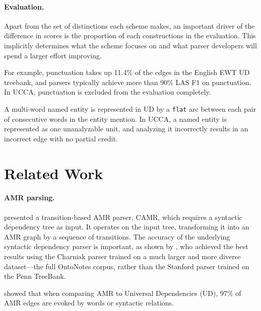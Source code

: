 \documentclass[11pt,a4paper]{article}
\begin{document}
\paragraph{Evaluation.}

Apart from the set of distinctions each scheme makes,
an important driver of the difference in scores is the proportion of each constructions
in the evaluation.
This implicitly determines what the scheme focuses on and what parser developers
will spend a larger effort improving.

For example, punctuation takes up 11.4\% of the edges in the English EWT UD treebank,
and parsers typically achieve more than 90\% LAS F1 on punctuation.
In UCCA, punctuation is excluded from the evaluation completely.

A multi-word named entity is represented in UD by a \verb|flat| arc between
each pair of consecutive words in the entity mention.
In UCCA, a named entity is represented as one unanalyzable unit, and analyzing it
incorrectly results in an incorrect edge with no partial credit.

\section{Related Work}\label{sec:related_work}

\paragraph{AMR parsing.}

presented a transition-based AMR parser, CAMR, which requires a
syntactic dependency tree as input.
It operates on the input tree, transforming it into an AMR graph
by a sequence of transitions.
The accuracy of the underlying syntactic dependency parser is important,
as shown by ,
who achieved the best results using the Charniak parser trained on a
much larger and more diverse dataset---the full OntoNotes corpus,
rather than the Stanford parser trained on the Penn TreeBank.

 showed that when comparing AMR to Universal Dependencies (UD),
97\% of AMR edges are evoked by words or syntactic relations.


\end{document}
